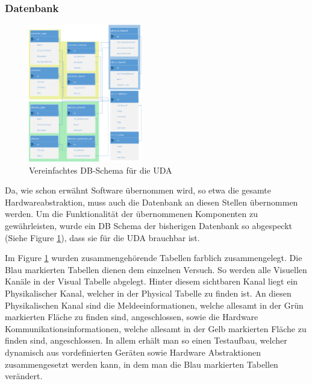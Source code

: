 \documentclass[10pt]{scrartcl}
\begin{document}
\subsubsection{Datenbank}
\begin{figure}
	\begin{center}
		\includegraphics[width=0.44\textwidth]{pictures/DBShemaEasy2}
		\caption{Vereinfachtes DB-Schema für die UDA}
		\label{fig:DBSchemaUDA}
	\end{center}
\end{figure}

Da, wie schon erwähnt Software übernommen wird, so etwa die gesamte Hardwareabstraktion, muss auch die Datenbank an diesen Stellen übernommen werden. Um die Funktionalität der übernommenen Komponenten zu gewährleisten, wurde ein DB Schema der bisherigen Datenbank so abgespeckt (Siehe Figure \ref{fig:DBSchemaUDA}), dass sie für die UDA brauchbar ist.


Im Figure \ref{fig:DBSchemaUDA} wurden zusammengehörende Tabellen farblich zusammengelegt. Die Blau markierten Tabellen dienen dem einzelnen Versuch. So werden alle Visuellen Kanäle in der Visual Tabelle abgelegt. Hinter diesem sichtbaren Kanal liegt ein Physikalischer Kanal, welcher in der Physical Tabelle zu finden ist. An diesen Physikalischen Kanal sind die Meldeeinformationen, welche allesamt in der Grün markierten Fläche zu finden sind, angeschlossen, sowie die Hardware Kommunikationsinformationen, welche allesamt in der Gelb markierten Fläche zu finden sind, angeschlossen. In allem erhält man so einen Testaufbau, welcher dynamisch aus vordefinierten Geräten sowie Hardware Abstraktionen zusammengesetzt werden kann, in dem man die Blau markierten Tabellen verändert.
\end{document}
